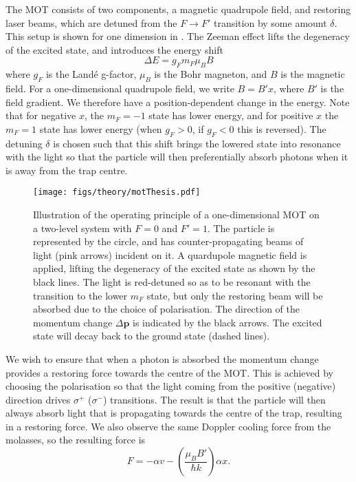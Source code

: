 The MOT consists of two components, a magnetic quadrupole field, and restoring
laser beams, which are detuned from the $F\rightarrow F'$ transition by some
amount $\delta$. This setup is shown for one dimension in
. The Zeeman effect lifts the degeneracy of the excited state, and
introduces the energy shift~\cite{Binney}
%
\begin{equation}
  \Delta E = g_F m_F \mu_B B
  \label{theory:eqn:zeeman}
\end{equation}
%
where $g_F$ is the Land\'e g-factor, $\mu_B$ is the Bohr magneton, and $B$ is
the magnetic field. For a one-dimensional quadrupole field, we write $B=B'x$,
where $B'$ is the field gradient. We therefore have a position-dependent change
in the energy. Note that for negative $x$, the $m_F=-1$ state has lower energy,
and for positive $x$ the $m_F=1$ state has lower energy (when $g_F>0$, if
$g_F<0$ this is reversed).
%
The detuning $\delta$ is chosen such that this shift brings the lowered state
into resonance with the light so that the particle will then preferentially
absorb photons when it is away from the trap centre.

\begin{figure}[ht]
  \centering
  \texttt{[image: figs/theory/motThesis.pdf]}
  \caption{Illustration of the operating principle of a one-dimensional MOT on
    a two-level system with $F=0$ and $F'=1$. The particle is represented by
    the circle, and has counter-propagating beams of light (pink arrows)
    incident on it. A quardupole magnetic field is applied, lifting the
    degeneracy of the excited state as shown by the black lines. The light is
    red-detuned so as to be resonant with the transition to the lower $m_F$
    state, but only the restoring beam will be absorbed due to the choice of
    polarisation. The direction of the momentum change $\Delta\mathbf{p}$ is
    indicated by the black arrows. The excited state will decay back to the
    ground state (dashed lines).
  }
  \label{theory:fig:MOT}
\end{figure}

We wish to ensure that when a photon is absorbed the momentum change provides a
restoring force towards the centre of the MOT. This is achieved by choosing the
polarisation  so that the light coming from the positive (negative) direction
drives $\sigma^+$ ($\sigma^-$) transitions. The result is
that the particle will then always absorb light that is propagating towards the
centre of the trap, resulting in a restoring force. We also observe the same
Doppler cooling force from the molasses, so the resulting force is
%
\begin{equation}
  F = - \alpha v - \left(\frac{\mu_B B'}{\hbar k}\right)\alpha x.
\end{equation}

